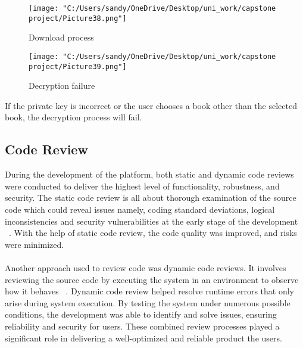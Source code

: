 \documentclass[12pt]{article}
\begin{document}
\begin{figure}[H]
	\centering
	\texttt{[image: "C:/Users/sandy/OneDrive/Desktop/uni\_work/capstone project/Picture38.png"]}
	\caption{Download process}
	
\end{figure}

\begin{figure}[H]
	\centering
	\texttt{[image: "C:/Users/sandy/OneDrive/Desktop/uni\_work/capstone project/Picture39.png"]}
	\caption{Decryption failure}
	
\end{figure}
If the private key is incorrect or the user chooses a book other than the selected book, the decryption process will fail.

\subsection{Code Review}
During the development of the platform, both static and dynamic code reviews were conducted to deliver the highest level of functionality, robustness, and security. The static code review is all about thorough examination of the source code which could reveal issues namely, coding standard deviations, logical inconsistencies and security vulnerabilities at the early stage of the development ~\cite{Eijs2024}. With the help of static code review, the code quality was improved, and risks were minimized. \\\\
Another approach used to review code was dynamic code reviews. It involves reviewing the source code by executing the system in an environment to observe how it behaves ~\cite{Gillis2024}. Dynamic code review helped resolve runtime errors that only arise during system execution. By testing the system under numerous possible conditions, the development was able to identify and solve issues, ensuring  reliability and security for users. These combined review processes  played a significant role in delivering a well-optimized and reliable product the users.
\end{document}
